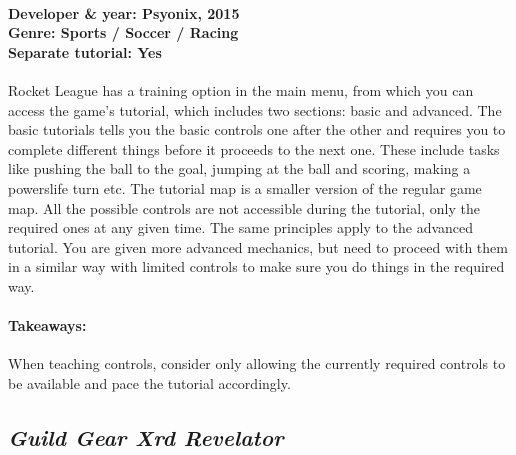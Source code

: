 \paragraph{Developer \& year: Psyonix, 2015 \\ Genre: Sports / Soccer / Racing \\ Separate tutorial: Yes \\}
Rocket League has a training option in the main menu, from which you can access the game's tutorial, which includes two sections: basic and advanced.
The basic tutorials tells you the basic controls one after the other and requires you to complete different things before it proceeds to the next one. These include tasks like pushing the ball to the goal, jumping at the ball and scoring, making a powerslife turn etc. The tutorial map is a smaller version of the regular game map. All the possible controls are not accessible during the tutorial, only the required ones at any given time.
The same principles apply to the advanced tutorial. You are given more advanced mechanics, but need to proceed with them in a similar way with limited controls to make sure you do things in the required way.
\paragraph{Takeaways:}
When teaching controls, consider only allowing the currently required controls to be available and pace the tutorial accordingly.

\subsection{\textit{Guild Gear Xrd Revelator}}
